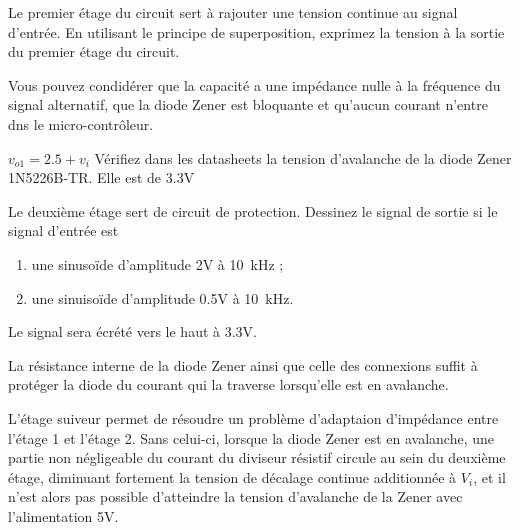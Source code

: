 \documentclass{../template/labo}
\begin{document}
\begin{predet}

\Question
{Le premier étage du circuit sert à rajouter une tension continue au signal d'entrée. En utilisant le principe de superposition, exprimez la tension à la sortie du premier étage du circuit. 

Vous pouvez condidérer que la capacité a une impédance nulle à la fréquence du signal alternatif, que la diode Zener est bloquante et qu'aucun courant n'entre dns le micro-contrôleur. }
{$v_{o1}=2.5+v_i$}
\label{Q:zener_1}
\Question
{Vérifiez dans les datasheets la tension d'avalanche de la diode Zener 1N5226B-TR. }
{Elle est de 3.3V}
\label{Q:zener_2}
\Question
{Le deuxième étage sert de circuit de protection. Dessinez le signal de sortie si le signal d'entrée est 
\begin{enumerate}
	\item une sinusoïde d'amplitude 2V à 10~kHz ;
	\item une sinuisoïde d'amplitude 0.5V à 10~kHz.
\end{enumerate}
}
{Le signal sera écrété vers le haut à 3.3V. }
\label{Q:zener_3}

\end{predet}
\begin{info}
	La résistance interne de la diode Zener ainsi que celle des connexions suffit à protéger la diode du courant qui la traverse lorsqu'elle est en avalanche.
\end{info}
\begin{info}
	L'étage suiveur permet de résoudre un problème d'adaptaion d'impédance entre l'étage 1 et l'étage 2. Sans celui-ci, lorsque la diode Zener est en avalanche, une partie non négligeable du courant du diviseur résistif circule au sein du deuxième étage, diminuant fortement la tension de décalage continue additionnée à $V_i$, et il n'est alors pas possible d'atteindre la tension d'avalanche de la Zener avec l'alimentation 5V.
\end{info}
\end{document}
